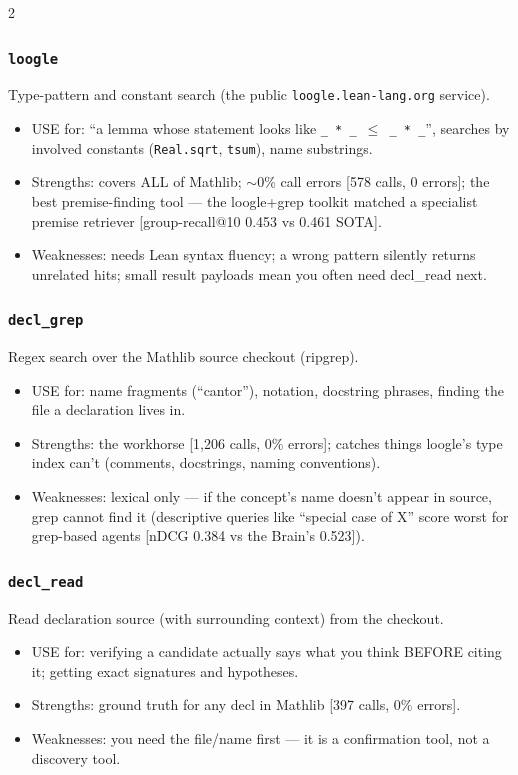 \documentclass[10pt]{article}
\newcommand{\code}[1]{\texttt{#1}}
\begin{document}
{\begin{multicols}{2}
\subsubsection{\code{loogle}}
Type-pattern and constant search (the public \code{loogle.lean-lang.org}
service).
\begin{itemize}
\item USE for: ``a lemma whose statement looks like
  \code{\_ * \_ ${\leq}$ \_ * \_}'', searches by involved constants
  (\code{Real.sqrt}, \code{tsum}), name substrings.
\item Strengths: covers ALL of Mathlib; ${\sim}$0\% call errors [578 calls,
  0 errors]; the best premise-finding tool --- the loogle+grep toolkit
  matched a specialist premise retriever [group-recall@10 0.453 vs 0.461
  SOTA].
\item Weaknesses: needs Lean syntax fluency; a wrong pattern silently
  returns unrelated hits; small result payloads mean you often need
  decl\_read next.
\end{itemize}

\subsubsection{\code{decl\_grep}}
Regex search over the Mathlib source checkout (ripgrep).
\begin{itemize}
\item USE for: name fragments (``cantor''), notation, docstring phrases,
  finding the file a declaration lives in.
\item Strengths: the workhorse [1{,}206 calls, 0\% errors]; catches things
  loogle's type index can't (comments, docstrings, naming conventions).
\item Weaknesses: lexical only --- if the concept's name doesn't appear in
  source, grep cannot find it (descriptive queries like ``special case of
  X'' score worst for grep-based agents [nDCG 0.384 vs the Brain's 0.523]).
\end{itemize}

\subsubsection{\code{decl\_read}}
Read declaration source (with surrounding context) from the checkout.
\begin{itemize}
\item USE for: verifying a candidate actually says what you think BEFORE
  citing it; getting exact signatures and hypotheses.
\item Strengths: ground truth for any decl in Mathlib [397 calls, 0\%
  errors].
\item Weaknesses: you need the file/name first --- it is a confirmation
  tool, not a discovery tool.
\end{itemize}


\end{multicols}}
\end{document}
